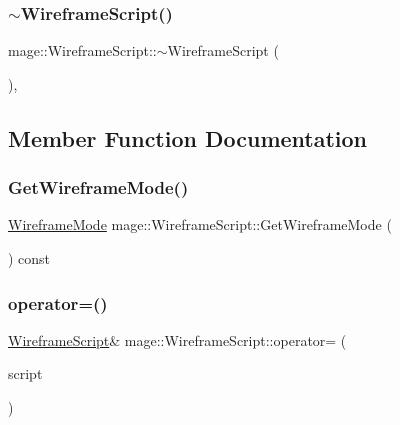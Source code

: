 \hypertarget{classmage_1_1_wireframe_script_abbb814f01dce03195e83b24bf244757f}{}\label{classmage_1_1_wireframe_script_abbb814f01dce03195e83b24bf244757f} 
\subsubsection{\texorpdfstring{$\sim$\+Wireframe\+Script()}{~WireframeScript()}}
{\footnotesize\ttfamily mage\+::\+Wireframe\+Script\+::$\sim$\+Wireframe\+Script (\begin{DoxyParamCaption}{ }\end{DoxyParamCaption})\hspace{0.3cm}{\ttfamily [virtual]}, {\ttfamily [default]}}



\subsection{Member Function Documentation}
\hypertarget{classmage_1_1_wireframe_script_accb26312ff13e368cc0a3ce565d893f4}{}\label{classmage_1_1_wireframe_script_accb26312ff13e368cc0a3ce565d893f4} 
\subsubsection{\texorpdfstring{Get\+Wireframe\+Mode()}{GetWireframeMode()}}
{\footnotesize\ttfamily \hyperlink{classmage_1_1_wireframe_script_a99d65e77e89c2581544e68030adcefb7}{Wireframe\+Mode} mage\+::\+Wireframe\+Script\+::\+Get\+Wireframe\+Mode (\begin{DoxyParamCaption}{ }\end{DoxyParamCaption}) const\hspace{0.3cm}{\ttfamily [noexcept]}}

\hypertarget{classmage_1_1_wireframe_script_a0382415dade9f889b1edebf2ee5aa770}{}\label{classmage_1_1_wireframe_script_a0382415dade9f889b1edebf2ee5aa770} 
\subsubsection{\texorpdfstring{operator=()}{operator=()}\hspace{0.1cm}{\footnotesize\ttfamily [1/2]}}
{\footnotesize\ttfamily \hyperlink{classmage_1_1_wireframe_script}{Wireframe\+Script}\& mage\+::\+Wireframe\+Script\+::operator= (\begin{DoxyParamCaption}\item[{const \hyperlink{classmage_1_1_wireframe_script}{Wireframe\+Script} \&}]{script }\end{DoxyParamCaption})\hspace{0.3cm}{\ttfamily [delete]}}

